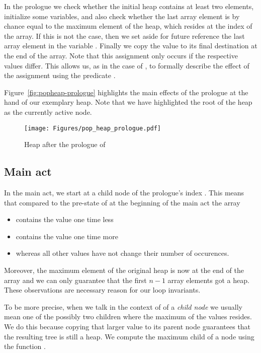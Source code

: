 In the prologue we check whether the initial heap contains at least two elements,
initialize some variables, and also check whether
the last array element is by chance equal to the maximum element of the heap,
which resides at the index  of the array.
If this is not the case, then we set aside for future
reference the last array element in the variable .
Finally we copy the value  to its final destination at the end
of the array.
Note that this assignment only occurs if the respective values differ.
This allows us, as in the case of , to formally describe the
effect of the assignment using the predicate .

Figure~\ref{fig:popheap-prologue} highlights the main effects of the prologue
at the hand of our exemplary heap.
Note that we have highlighted the root of the heap as the currently active node.

\begin{figure}[hbt]
\centering
\texttt{[image: Figures/pop\_heap\_prologue.pdf]}
\caption{Heap after the prologue of \popheap}
\end{figure}

\FloatBarrier


\subsection{Main act}

In the main act, we start at a child node  of the prologue's index .
This means that compared to the pre-state of \popheap
at the beginning of the main act the array 
\begin{itemize}
\item contains the value  one time less
\item contains the value  one time more
\item whereas all other values have not change their number of occurences.
\end{itemize}

Moreover, the maximum element of the original heap is now at the end of the array
and we can only guarantee that the first $n-1$ array elements got a heap.
These observations are necessary reason for our loop invariants.

To be more precise, when we talk in the context of \popheap
of a \emph{child node} we usually mean one of the possibly two children
where the maximum of the values resides.
We do this because copying that larger value to its parent node guarantees
that the resulting tree is still a heap.
We compute the maximum child of a node using the function .

